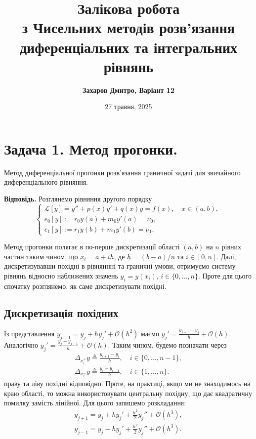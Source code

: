 \documentclass{test_template}
\title{\bfseries Залікова робота \\з Чисельних методів розв'язання \\ диференціальних та інтегральних рівнянь}
\author{\bfseries Захаров Дмитро, Варіант 12}
\date{27 травня, 2025}
\begin{document}
\pagestyle{fancy}

\maketitle

\tableofcontents

\newpage

\section{Задача 1. Метод прогонки.}

\begin{problem}
    Метод диференціальної прогонки розв'язання граничної задачі для звичайного 
    диференціального рівняння.
\end{problem}

\textbf{Відповідь.} Розглянемо рівняння другого порядку
\begin{equation*}
    \begin{cases}
        \mathcal{L}[y] = y'' + p(x)y' + q(x)y = f(x), \quad x \in (a,b), \\
        e_0[y] := r_0y(a) + m_0y'(a) = \nu_0, \\
        e_1[y] := r_1y(b) + m_1y'(b) = \nu_1,
    \end{cases}
\end{equation*}

Метод прогонки полягає в по-перше дискретизації області $(a,b)$ на $n$ рівних
частин таким чином, що $x_i = a + ih$, де $h = (b-a)/n$ та $i \in [0,n]$. Далі,
дискретизувавши похідні в рівняннні та граничні умови, отримуємо систему 
рівнянь відносно наближених значень $y_i = y(x_i)$, $i \in \{0,\dots,n\}$. 
Проте для цього спочатку розглянемо, як саме дискретизувати похідні.

\subsection{Дискретизація похідних}
Із представлення $y_{j+1} = y_j + hy_j' + \mathcal{O}(h^2)$ маємо $y_j' =
\frac{y_{j+1}-y_j}{h} + \mathcal{O}(h)$. Аналогічно $y_j' = \frac{y_j -
y_{j-1}}{h} + \mathcal{O}(h)$. Таким чином, будемо позначати через
\begin{gather*}
    \Delta_{x_i^+}y \triangleq \frac{y_{i+1} - y_i}{h}, \quad i \in \{0,\dots,n-1\}, \\
    \Delta_{x_i^-}y \triangleq \frac{y_i - y_{i-1}}{h}, \quad i \in \{1,\dots,n\}.
\end{gather*}
праву та ліву похідні відповідно. Проте, на практиці, якщо ми не знаходимось 
на краю області, то можна використовувати центральну похідну, що дає 
квадратичну помилку замість лінійної. Для цього запишемо розкладання:
\begin{gather*}
    y_{j+1} = y_j + hy_j' + \frac{h^2}{2}y_j'' + \mathcal{O}(h^3), \\
    y_{j-1} = y_j - hy_j' + \frac{h^2}{2}y_j'' + \mathcal{O}(h^3).
\end{gather*}
\end{document}
